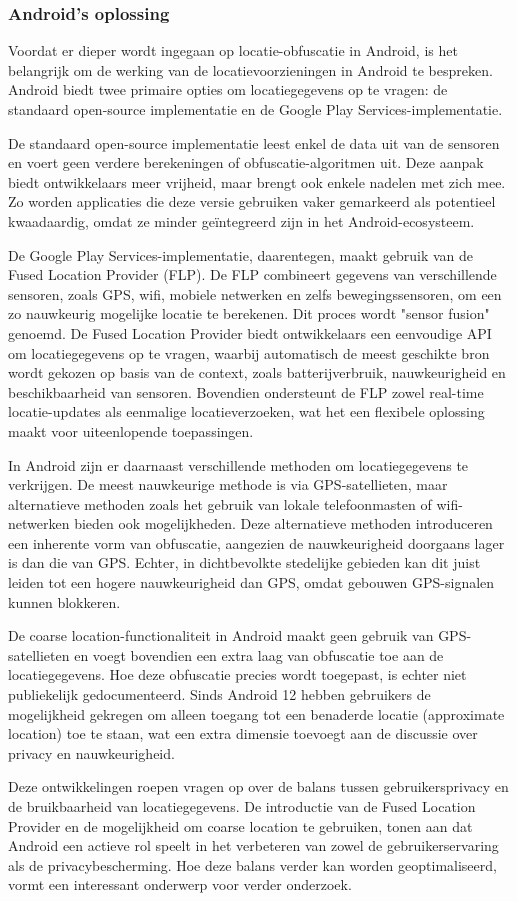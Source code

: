 \subsubsection*{Android's oplossing}
Voordat er dieper wordt ingegaan op locatie-obfuscatie in Android, is het belangrijk om de werking van de locatievoorzieningen in Android te bespreken. Android biedt twee primaire opties om locatiegegevens op te vragen: de standaard open-source implementatie en de Google Play Services-implementatie.

De standaard open-source implementatie leest enkel de data uit van de sensoren en voert geen verdere berekeningen of obfuscatie-algoritmen uit. Deze aanpak biedt ontwikkelaars meer vrijheid, maar brengt ook enkele nadelen met zich mee. Zo worden applicaties die deze versie gebruiken vaker gemarkeerd als potentieel kwaadaardig, omdat ze minder geïntegreerd zijn in het Android-ecosysteem.

De Google Play Services-implementatie, daarentegen, maakt gebruik van de Fused Location Provider (FLP). De FLP combineert gegevens van verschillende sensoren, zoals GPS, wifi, mobiele netwerken en zelfs bewegingssensoren, om een zo nauwkeurig mogelijke locatie te berekenen. Dit proces wordt "sensor fusion" genoemd. De Fused Location Provider biedt ontwikkelaars een eenvoudige API om locatiegegevens op te vragen, waarbij automatisch de meest geschikte bron wordt gekozen op basis van de context, zoals batterijverbruik, nauwkeurigheid en beschikbaarheid van sensoren. Bovendien ondersteunt de FLP zowel real-time locatie-updates als eenmalige locatieverzoeken, wat het een flexibele oplossing maakt voor uiteenlopende toepassingen.

In Android zijn er daarnaast verschillende methoden om locatiegegevens te verkrijgen. De meest nauwkeurige methode is via GPS-satellieten, maar alternatieve methoden zoals het gebruik van lokale telefoonmasten of wifi-netwerken bieden ook mogelijkheden. Deze alternatieve methoden introduceren een inherente vorm van obfuscatie, aangezien de nauwkeurigheid doorgaans lager is dan die van GPS. Echter, in dichtbevolkte stedelijke gebieden kan dit juist leiden tot een hogere nauwkeurigheid dan GPS, omdat gebouwen GPS-signalen kunnen blokkeren.

De coarse location-functionaliteit in Android maakt geen gebruik van GPS-satellieten en voegt bovendien een extra laag van obfuscatie toe aan de locatiegegevens. Hoe deze obfuscatie precies wordt toegepast, is echter niet publiekelijk gedocumenteerd. Sinds Android 12 hebben gebruikers de mogelijkheid gekregen om alleen toegang tot een benaderde locatie (approximate location) toe te staan, wat een extra dimensie toevoegt aan de discussie over privacy en nauwkeurigheid.

Deze ontwikkelingen roepen vragen op over de balans tussen gebruikersprivacy en de bruikbaarheid van locatiegegevens. De introductie van de Fused Location Provider en de mogelijkheid om coarse location te gebruiken, tonen aan dat Android een actieve rol speelt in het verbeteren van zowel de gebruikerservaring als de privacybescherming. Hoe deze balans verder kan worden geoptimaliseerd, vormt een interessant onderwerp voor verder onderzoek.


